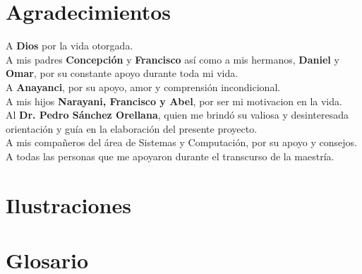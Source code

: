 \documentclass[12pt,letterpaper,titlepage]{article}
\begin{document}
\section{Agradecimientos}\label{agradec}
{\Large A \textbf{Dios} por la vida otorgada.\\[1cm]
\Large A mis padres \textbf{Concepción} y \textbf{Francisco} así como a mis hermanos, \textbf{Daniel} y \textbf{Omar}, por su constante apoyo durante toda mi vida.\\[1cm]
\Large A \textbf{Anayanci}, por su apoyo, amor y comprensión incondicional.\\[1cm]
\Large A mis hijos \textbf{Narayani, Francisco y Abel},  por ser mi motivacion en la vida.\\[1cm]
\Large Al \textbf{Dr. Pedro Sánchez Orellana}, quien me brindó su valiosa y desinteresada orientación y guía en la elaboración del presente proyecto.\\[1cm]
\Large A mis compañeros del área de Sistemas y Computación, por su apoyo y consejos.\\[1cm]
\Large A todas las personas que me apoyaron durante el transcurso de la maestría.\\[1cm]
}
\newpage
\Large
\begin{center}
\tableofcontents
\end{center}



\newpage
{}
\section{Ilustraciones}\label{ilustraciones}
\listoffigures



\newpage
{}
\section{Glosario}\label{glosario}
\end{document}
